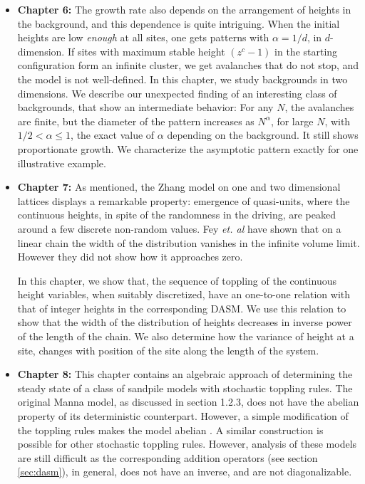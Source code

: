 \documentclass[11pt,a4paper]{book}
\begin{document}
\begin{itemize}
\item[]\textbf{Chapter 6:} The growth rate also depends on the
arrangement of heights in the background, and this dependence is quite intriguing. When the
initial heights are low \textit{enough} at all sites, one gets
patterns with $\alpha={1/d}$, in $d$-dimension. If sites with maximum
stable height $\left( z^{c}-1 \right)$ in the starting configuration
form an infinite cluster, we get avalanches that do not stop, and the
model is not well-defined. In this chapter, we study backgrounds in
two dimensions. We describe our unexpected finding of an interesting
class of backgrounds, that show an intermediate behavior: For any $N$,
the avalanches are finite, but  the diameter of the pattern increases
as $N^{\alpha}$, for large $N$, with $1/2 < \alpha \leq 1$, the exact
value of $\alpha$ depending on the background. It still shows
proportionate growth. We characterize the asymptotic pattern exactly
for one illustrative example.

\item[]{\textbf{Chapter 7:} As mentioned, the Zhang model on one
and two dimensional lattices displays a remarkable property: emergence
of quasi-units, where the continuous heights, in spite of the
randomness in the driving, are peaked around a few discrete non-random
values. Fey \textit{et. al} have shown that on a linear chain the
width of the distribution vanishes in the infinite volume limit.
However they did not show how it approaches zero.

In this chapter, we show that, the sequence of toppling of the continuous height
variables, when suitably discretized, have an one-to-one relation with
that of integer heights in the corresponding DASM. We use this
relation to show that the width of the distribution of heights
decreases in inverse power of the length of the chain. We also
determine how the variance of height at a site, changes with position
of the site along the length of the system.}

\item[]{\textbf{Chapter 8:} This chapter contains an algebraic approach of
determining the steady state of a class of sandpile models with
stochastic toppling rules. The original Manna model, as
discussed in section 1.2.3, does not have the abelian property of its
deterministic
counterpart. However, a simple modification
of the toppling rules makes the model abelian \cite{dm}. A similar construction is
possible for other stochastic toppling rules. However, analysis of
these
models are still difficult as the corresponding addition operators
(see section \ref{sec:dasm}), in general, does not have an inverse, and are not diagonalizable.

}
\end{itemize}
\end{document}
